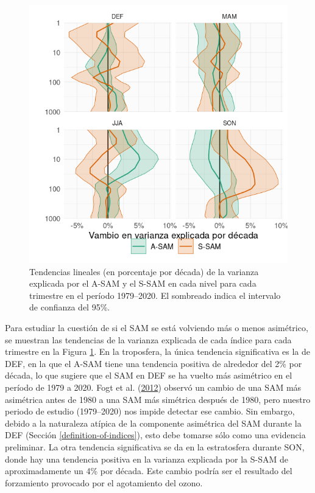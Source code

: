 \documentclass[12pt,oneside,a4paper]{reedthesis}
\begin{document}
\begin{figure}

{\centering \includegraphics{figures/30-sam/r-squared-trend-1} 

}

\caption{Tendencias lineales (en porcentaje por década) de la varianza explicada por el A-SAM y el S-SAM en cada nivel para cada trimestre en el período 1979--2020. El sombreado indica el intervalo de confianza del 95\%.}\label{fig:r-squared-trend}
\end{figure}

Para estudiar la cuestión de si el SAM se está volviendo más o menos asimétrico, se muestran las tendencias de la varianza explicada de cada índice para cada trimestre en la Figura \ref{fig:r-squared-trend}.
En la troposfera, la única tendencia significativa es la de DEF, en la que el A-SAM tiene una tendencia positiva de alrededor del 2\% por década, lo que sugiere que el SAM en DEF se ha vuelto más asimétrico en el período de 1979 a 2020.
Fogt et al. (\protect\hyperlink{ref-fogt2012}{2012}) observó un cambio de una SAM más asimétrica antes de 1980 a una SAM más simétrica después de 1980, pero nuestro periodo de estudio (1979--2020) nos impide detectar ese cambio.
Sin embargo, debido a la naturaleza atípica de la componente asimétrica del SAM durante la DEF (Sección \ref{definition-of-indices}), esto debe tomarse sólo como una evidencia preliminar.
La otra tendencia significativa se da en la estratosfera durante SON, donde hay una tendencia positiva en la varianza explicada por la S-SAM de aproximadamente un 4\% por década.
Este cambio podría ser el resultado del forzamiento provocado por el agotamiento del ozono.
\end{document}
